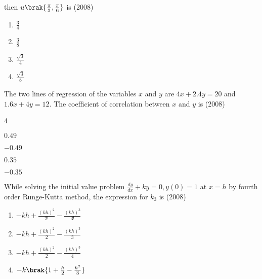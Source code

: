 then $u\brak{\frac{\pi}{3}, \frac{\pi}{6}}$ is
\hfill{(2008)}
		\begin{enumerate}
			\item $\frac{3}{4}$
			\item $\frac{3}{8}$
	         	\item $\frac{\sqrt{3}}{4}$
                 	\item $\frac{\sqrt{3}}{8}$
	\end{enumerate}	
    \item The two lines of regression of the variables $x$ and $y$ are $4 x+2.4 y=20$ and $1.6 x+4 y=12$.
The coefficient of correlation between $x$ and $y$ is
\hfill{(2008)}
      \begin{enumerate}
	       \end{enumerate}
        \item  While solving the initial value problem
$\frac{d y}{d x}+k y=0, y(0)=1$ at $x=h$ by fourth order Runge-Kutta method, the expression for $k_{3}$ is
\hfill{(2008)}
            \begin{enumerate}
			\item $-k h+\frac{(k h)^{2}}{2!}-\frac{(k h)^{3}}{3!}$
			\item $-k h+\frac{(k h)^{2}}{2}-\frac{(k h)^{3}}{3}$
			\item $-k h+\frac{(k h)^{2}}{2}-\frac{(k h)^{3}}{4}$
			\item $-k\brak{1+\frac{h}{2}-\frac{h^{2}}{3}}$
        	\end{enumerate}	

